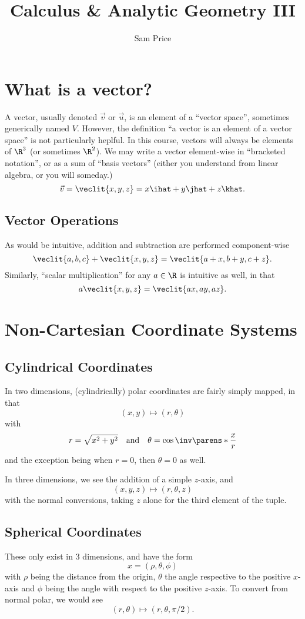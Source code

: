 \documentclass{article}
\title{Calculus \& Analytic Geometry III}
\author{Sam Price}
\begin{document}
\maketitle

\section{What is a vector?}

A vector, usually denoted $\vec{v}$ or $\vec{u}$, is an element of a ``vector space'', sometimes generically named $V$. However, the definition
``a vector is an element of a vector space'' is not particularly heplful. In this course, vectors will always be elements of $\R^{3}$ (or sometimes $\R^{2}$).
We may write a vector element-wise in ``bracketed notation'', or as a sum of ``basis vectors'' (either you understand from linear algebra, or you will someday.)
\[ \vec{v} = \veclit{x, y, z} = x\ihat + y\jhat + z\khat. \]

\subsection{Vector Operations}

As would be intuitive, addition and subtraction are performed component-wise
\[ \veclit{a, b, c} + \veclit{x, y, z} = \veclit{a + x, b + y, c + z}. \]
Similarly, ``scalar multiplication'' for any $a \in \R$ is intuitive as well, in that
\[ a\veclit{x, y, z} = \veclit{ax, ay, az}. \]

\section{Non-Cartesian Coordinate Systems}
\subsection{Cylindrical Coordinates}
In two dimensions, (cylindrically) polar coordinates are fairly simply mapped, in that
\[ (x, y) \mapsto (r, \theta) \]
with
\[ r = \sqrt{x^{2} + y^{2}} \quad\text{and}\quad \theta = \cos\inv\parens*{\frac{x}{r}} \]
and the exception being when $r = 0$, then $\theta = 0$ as well.

In three dimensions, we see the addition of a simple $z$-axis, and
\[ (x, y, z) \mapsto (r, \theta, z) \]
with the normal conversions, taking $z$ alone for the third element of the tuple.

\subsection{Spherical Coordinates}
These only exist in 3 dimensions, and have the form
\[ x = (\rho, \theta, \phi) \]
with $\rho$ being the distance from the origin, $\theta$ the angle respective to the positive $x$-axis
and $\phi$ being the angle with respect to the positive $z$-axis. To convert from normal polar, we would see
\[ (r, \theta) \mapsto (r, \theta, \pi/2). \]
\end{document}

